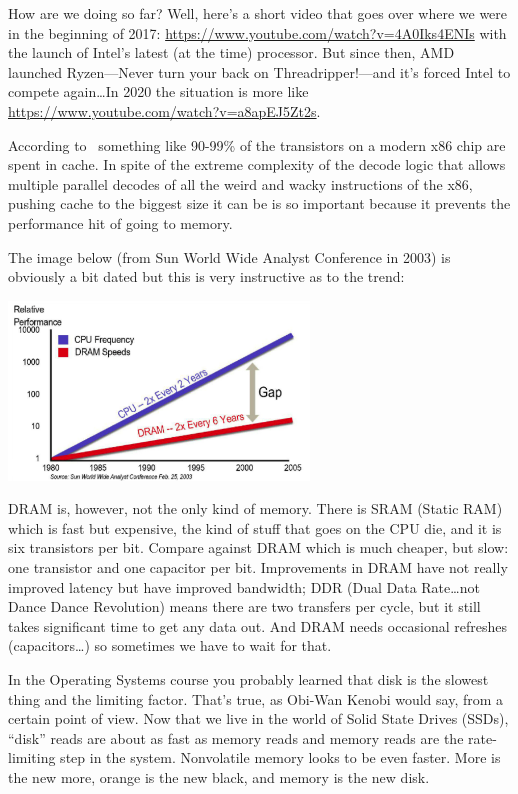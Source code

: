 \documentclass[a4paper]{report}
\begin{document}
How are we doing so far? Well, here's a short video that goes over where we were in the beginning of 2017: \url{https://www.youtube.com/watch?v=4A0Iks4ENIs} with the launch of Intel's latest (at the time) processor. But since then, AMD launched Ryzen---Never turn your back on Threadripper!---and it's forced Intel to compete again\ldots In 2020 the situation is more like \url{https://www.youtube.com/watch?v=a8apEJ5Zt2s}.

According to~\cite{modern-hardware} something like 90-99\% of the transistors on a modern x86 chip are spent in cache. In spite of the extreme complexity of the decode logic that allows multiple parallel decodes of all the weird and wacky instructions of the x86, pushing cache to the biggest size it can be is so important because it prevents the performance hit of going to memory.

The image below (from Sun World Wide Analyst Conference in 2003) is obviously a bit dated but this is very instructive as to the trend:
\begin{center}
\includegraphics[width=0.6\textwidth]{images/ram-vs-cpu.png}
\end{center}

DRAM is, however, not the only kind of memory. There is SRAM (Static RAM) which is fast but expensive, the kind of stuff that goes on the CPU die, and it is six transistors per bit. Compare against DRAM which is much cheaper, but slow: one transistor and one capacitor per bit. Improvements in DRAM have not really improved latency but have improved bandwidth; DDR (Dual Data Rate\ldots not Dance Dance Revolution) means there are two transfers per cycle, but it still takes significant time to get any data out. And DRAM needs occasional refreshes (capacitors\ldots) so sometimes we have to wait for that.

In the Operating Systems course you probably learned that disk is the slowest thing and the limiting factor. That's true, as Obi-Wan Kenobi would say, from a certain point of view. Now that we live in the world of Solid State Drives (SSDs), ``disk'' reads are about as fast as memory reads and memory reads are the rate-limiting step in the system. Nonvolatile memory looks to be even faster. More is the new more, orange is the new black, and memory is the new disk.
\end{document}
